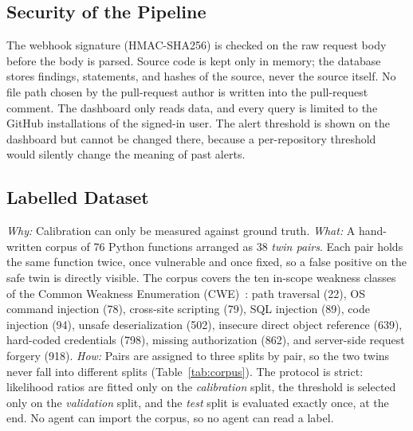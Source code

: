 \documentclass[conference]{IEEEtran}
\begin{document}
\subsection{Security of the Pipeline}
The webhook signature (HMAC-SHA256) is checked on the raw request body
before the body is parsed. Source code is kept only in memory; the
database stores findings, statements, and hashes of the source, never the
source itself. No file path chosen by the pull-request author is written
into the pull-request comment. The dashboard only reads data, and every
query is limited to the GitHub installations of the signed-in user. The
alert threshold is shown on the dashboard but cannot be changed there,
because a per-repository threshold would silently change the meaning of
past alerts.

\subsection{Labelled Dataset}
\textit{Why:} Calibration can only be measured against ground truth.
\textit{What:} A hand-written corpus of 76 Python functions arranged as 38
\emph{twin pairs}. Each pair holds the same function twice, once vulnerable
and once fixed, so a false positive on the safe twin is directly visible.
The corpus covers the ten in-scope weakness classes of the Common Weakness
Enumeration (CWE)~\cite{cwe}: path traversal (22), OS command injection
(78), cross-site scripting (79), SQL injection (89), code injection (94),
unsafe deserialization (502), insecure direct object reference (639),
hard-coded credentials (798), missing authorization (862), and
server-side request forgery (918).
\textit{How:} Pairs are assigned to three splits by pair, so the two twins
never fall into different splits (Table~\ref{tab:corpus}). The protocol is
strict: likelihood ratios are fitted only on the \emph{calibration} split,
the threshold is selected only on the \emph{validation} split, and the
\emph{test} split is evaluated exactly once, at the end. No agent can
import the corpus, so no agent can read a label.
\end{document}
